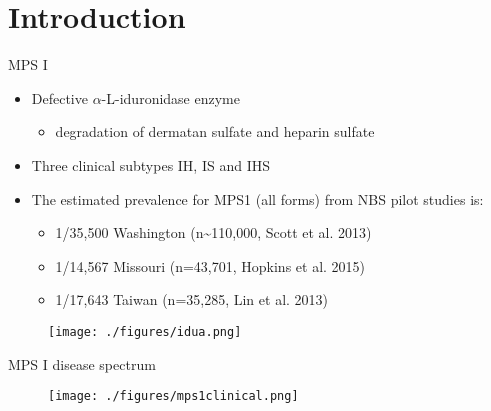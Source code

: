 \documentclass[presentation, smaller]{beamer}
\begin{document}
\section{Introduction}
\label{sec:orgheadline4}
\begin{frame}[label={sec:orgheadline1}]{MPS I}
\begin{itemize}
\item Defective \(\alpha\)-L-iduronidase enzyme
\begin{itemize}
\item degradation of dermatan sulfate and heparin sulfate
\end{itemize}
\item Three clinical subtypes IH, IS and IHS

\item The estimated prevalence for MPS1 (all forms) from NBS pilot studies is: 
\begin{itemize}
\item 1/35,500 Washington ​(n\textasciitilde{}110,000, Scott et al. 2013)
\item 1/14,567 Missouri ​(n=43,701, Hopkins et al. 2015)
\item 1/17,643 Taiwan ​(n=35,285, Lin et al. 2013)
\end{itemize}
\end{itemize}


\begin{figure}[htb]
\centering
\texttt{[image: ./figures/idua.png]}
\label{fig:idua}
\end{figure}
\end{frame}


\begin{frame}[label={sec:orgheadline2}]{MPS I disease spectrum}
\begin{figure}[htb]
\centering
\texttt{[image: ./figures/mps1clinical.png]}
\label{fig:mps1}
\end{figure}
\end{frame}
\end{document}
